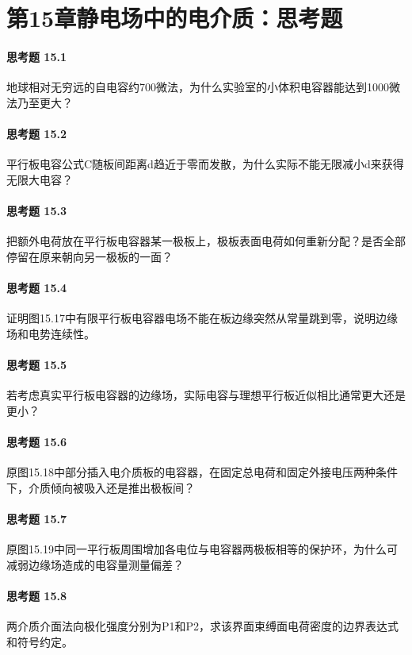 \section*{第15章\quad 静电场中的电介质：思考题}
\paragraph{思考题 15.1}
地球相对无穷远的自电容约700微法，为什么实验室的小体积电容器能达到1000微法乃至更大？

\paragraph{思考题 15.2}
平行板电容公式C随板间距离d趋近于零而发散，为什么实际不能无限减小d来获得无限大电容？

\paragraph{思考题 15.3}
把额外电荷放在平行板电容器某一极板上，极板表面电荷如何重新分配？是否全部停留在原来朝向另一极板的一面？

\paragraph{思考题 15.4}
证明图15.17中有限平行板电容器电场不能在板边缘突然从常量跳到零，说明边缘场和电势连续性。

\paragraph{思考题 15.5}
若考虑真实平行板电容器的边缘场，实际电容与理想平行板近似相比通常更大还是更小？

\paragraph{思考题 15.6}
原图15.18中部分插入电介质板的电容器，在固定总电荷和固定外接电压两种条件下，介质倾向被吸入还是推出极板间？

\paragraph{思考题 15.7}
原图15.19中同一平行板周围增加各电位与电容器两极板相等的保护环，为什么可减弱边缘场造成的电容量测量偏差？

\paragraph{思考题 15.8}
两介质介面法向极化强度分别为P1和P2，求该界面束缚面电荷密度的边界表达式和符号约定。

